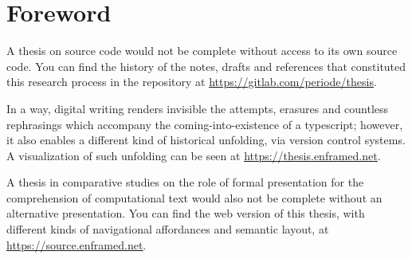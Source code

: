 \section*{Foreword}

A thesis on source code would not be complete without access to its own source code. You can find the history of the notes, drafts and references that constituted this research process in the repository at {\underline{\url{https://gitlab.com/periode/thesis}}}.

\spacersmall

In a way, digital writing renders invisible the attempts, erasures and countless rephrasings which accompany the coming-into-existence of a typescript; however, it also enables a different kind of historical unfolding, via version control systems. A visualization of such unfolding can be seen at {\underline{\url{https://thesis.enframed.net}}}.

\spacersmall

A thesis in comparative studies on the role of formal presentation for the comprehension of computational text would also not be complete without an alternative presentation. You can find the web version of this thesis, with different kinds of navigational affordances and semantic layout, at {\underline{\url{https://source.enframed.net}}}.
